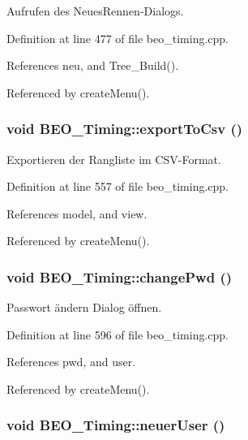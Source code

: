 Aufrufen des NeuesRennen-Dialogs. 



Definition at line 477 of file beo\_\-timing.cpp.

References neu, and Tree\_\-Build().

Referenced by createMenu().\hypertarget{class_b_e_o___timing_c04ab99954514a018e78de4b0224cdb5}{
\subsubsection[exportToCsv]{\setlength{\rightskip}{0pt plus 5cm}void BEO\_\-Timing::exportToCsv ()}}
\label{class_b_e_o___timing_c04ab99954514a018e78de4b0224cdb5}


Exportieren der Rangliste im CSV-Format. 



Definition at line 557 of file beo\_\-timing.cpp.

References model, and view.

Referenced by createMenu().\hypertarget{class_b_e_o___timing_b705f7916ae9647060ea70c1e8fb60d8}{
\subsubsection[changePwd]{\setlength{\rightskip}{0pt plus 5cm}void BEO\_\-Timing::changePwd ()}}
\label{class_b_e_o___timing_b705f7916ae9647060ea70c1e8fb60d8}


Passwort ändern Dialog öffnen. 



Definition at line 596 of file beo\_\-timing.cpp.

References pwd, and user.

Referenced by createMenu().\hypertarget{class_b_e_o___timing_1ae33dd83b22ab12aed7c68028ad363a}{
\subsubsection[neuerUser]{\setlength{\rightskip}{0pt plus 5cm}void BEO\_\-Timing::neuerUser ()}}
\label{class_b_e_o___timing_1ae33dd83b22ab12aed7c68028ad363a}


